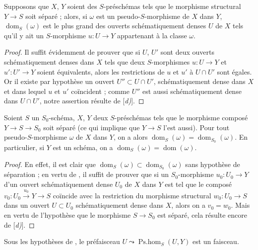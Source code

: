 \begin{proposition}[20.2.4]
\label{IV.20.2.4}
Supposons que $X$, $Y$ soient des $S$-préschémas tels que le morphisme structural $Y\to S$ soit séparé ; alors, si $\omega$ est un pseudo-$S$-morphisme de $X$ dans $Y$, $\operatorname{dom}_S(\omega)$ est le plus grand des ouverts schématiquement denses $U$ de $X$ tels qu'il y ait un $S$-morphisme $u:U\to Y$ appartenant à la classe $\omega$.
\end{proposition}

\begin{proof}
Il suffit évidemment de prouver que si $U$, $U'$ sont deux ouverts schématiquement denses dans $X$ tels que deux $S$-morphismes $u:U\to Y$ et $u':U'\to Y$ soient équivalents, alors les restrictions de $u$ et $u'$ à $U\cap U'$ sont égales.
Or il existe par hypothèse un ouvert $U''\subset U\cap U'$, schématiquement dense dans $X$ et dans lequel $u$ et $u'$ coïncident ; comme $U''$ est aussi schématiquement dense dans $U\cap U'$, notre assertion résulte de [\emph{d)}].
\end{proof}

\begin{corollary}[20.2.5]
\label{IV.20.2.5}
Soient $S$ un $S_0$-schéma, $X$, $Y$ deux $S$-préschémas tels que le morphisme composé $Y\to S\to S_0$ soit séparé (ce qui implique  que $Y\to S$ l'est aussi).
Pour tout pseudo-$S$-morphisme $\omega$ de $X$ dans $Y$, on a alors $\operatorname{dom}_S(\omega)=\operatorname{dom}_{S_0}(\omega)$.
En particulier, si $Y$ est un schéma, on a $\operatorname{dom}_S(\omega)=\operatorname{dom}(\omega)$.
\end{corollary}

\begin{proof}
En effet, il est clair que $\operatorname{dom}_S(\omega)\subset\operatorname{dom}_{S_0}(\omega)$ sans hypothèse de séparation ; en vertu de , il suffit de prouver que si un $S_0$-morphisme $u_0:U_0\to Y$ d'un ouvert
schématiquement dense $U_0$ de $X$ dans $Y$ est tel que le composé $v_0:U_0\xrightarrow{u_0}Y\to S$ coïncide avec la restriction du morphisme structural $w_0:U_0\to S$ dans un ouvert $U\subset U_0$ schématiquement dense dans $X$, alors on a $v_0=w_0$.
Mais en vertu de l'hypothèse que le morphisme $S\to S_0$ est séparé, cela résulte encore de [\emph{d)}].
\end{proof}

\begin{corollary}[20.2.6]
\label{IV.20.2.6}
Sous les hypothèses de , le préfaisceau $U\leadsto\operatorname{Ps.hom}_S(U,Y)$ est un faisceau.
\end{corollary}

